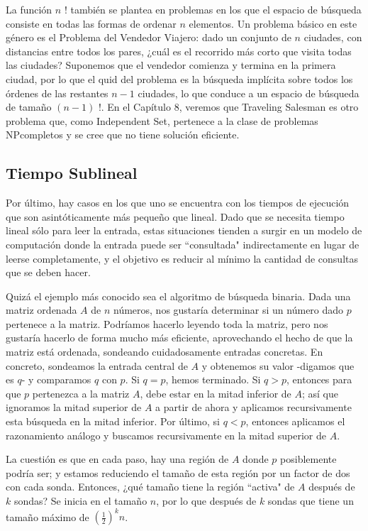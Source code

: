 \documentclass[a4paper, 12pt]{book}
\theoremstyle{dotless}
\begin{document}
La función $n$ ! también se plantea en problemas en los que el espacio de búsqueda consiste en todas las formas de ordenar $n$ elementos. Un problema básico en este género es el Problema del Vendedor Viajero: dado un conjunto de $n$ ciudades, con distancias entre todos los pares, ¿cuál es el recorrido más corto que visita todas las ciudades? Suponemos que el vendedor comienza y termina en la primera ciudad, por lo que el quid del problema es la búsqueda implícita sobre todos los órdenes de las restantes $n-1$ ciudades, lo que conduce a un espacio de búsqueda de tamaño $(n-1)$ !. En el Capítulo 8, veremos que Traveling Salesman es otro problema que, como Independent Set, pertenece a la clase de problemas NPcompletos y se cree que no tiene solución eficiente.

\subsection*{Tiempo Sublineal}
Por último, hay casos en los que uno se encuentra con los tiempos de ejecución que son asintóticamente más pequeño que lineal. Dado que se necesita tiempo lineal sólo para leer la entrada, estas situaciones tienden a surgir en un modelo de computación donde la entrada puede ser ``consultada" indirectamente en lugar de leerse completamente, y el objetivo es reducir al mínimo la cantidad de consultas que se deben hacer.

Quizá el ejemplo más conocido sea el algoritmo de búsqueda binaria. Dada una matriz ordenada $A$ de $n$ números, nos gustaría determinar si un número dado $p$ pertenece a la matriz. Podríamos hacerlo leyendo toda la matriz, pero nos gustaría hacerlo de forma mucho más eficiente, aprovechando el hecho de que la matriz está ordenada, sondeando cuidadosamente entradas concretas. En concreto, sondeamos la entrada central de $A$ y obtenemos su valor -digamos que es $q$- y comparamos $q$ con $p$. Si $q=p$, hemos terminado. Si $q>p$, entonces para que $p$ pertenezca a la matriz $A$, debe estar en la mitad inferior de $A$; así que ignoramos la mitad superior de $A$ a partir de ahora y aplicamos recursivamente esta búsqueda en la mitad inferior. Por último, si $q<p$, entonces aplicamos el razonamiento análogo y buscamos recursivamente en la mitad superior de $A$.

La cuestión es que en cada paso, hay una región de $A$ donde $p$ posiblemente podría ser; y estamos reduciendo el tamaño de esta región por un factor de dos con cada sonda. Entonces, ¿qué tamaño tiene la región ``activa" de $A$ después de $k$ sondas? Se inicia en el tamaño $ n $, por lo que después de $ k $ sondas que tiene un tamaño máximo de $(\frac{1}{2})^{k}n$.
\end{document}
